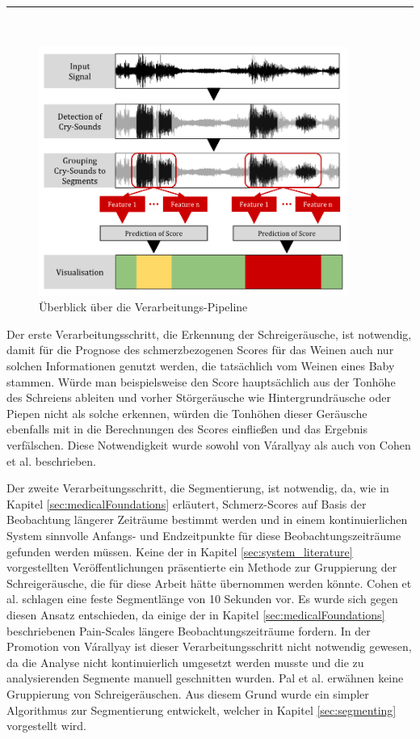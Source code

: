 \noindent\rule{\linewidth}{0.3pt} \\

\begin{figure}[h]
	\centering
	\includegraphics[width=0.9\textwidth]{bilder/konzept03.png}
	\caption{Überblick über die Verarbeitungs-Pipeline}
	\label{img:architecture-overview}
\end{figure}

Der erste Verarbeitungsschritt, die Erkennung der Schreigeräusche, ist notwendig, damit für die Prognose des schmerzbezogenen Scores für das Weinen auch nur solchen Informationen genutzt werden, die tatsächlich vom Weinen eines Baby stammen. Würde man beispielsweise den Score hauptsächlich aus der Tonhöhe des Schreiens ableiten und vorher Störgeräusche wie Hintergrundräusche oder Piepen nicht als solche erkennen, würden die Tonhöhen dieser Geräusche ebenfalls mit in die Berechnungen des Scores einfließen und das Ergebnis verfälschen. Diese Notwendigkeit wurde sowohl von Várallyay \cite{cry_thesis} als auch von Cohen et al. \cite{cohenCry} beschrieben. 

Der zweite Verarbeitungsschritt, die Segmentierung, ist notwendig, da, wie in Kapitel \ref{sec:medicalFoundations} erläutert, Schmerz-Scores auf Basis der Beobachtung längerer Zeiträume bestimmt werden und in einem kontinuierlichen System sinnvolle Anfangs- und Endzeitpunkte für diese Beobachtungszeiträume gefunden werden müssen. Keine der in Kapitel \ref{sec:system_literature} vorgestellten Veröffentlichungen präsentierte ein Methode zur Gruppierung der Schreigeräusche, die für diese Arbeit hätte übernommen werden könnte. Cohen et al. \cite{cohenCry} schlagen eine feste Segmentlänge von 10 Sekunden vor. Es wurde sich gegen diesen Ansatz entschieden, da einige der in Kapitel \ref{sec:medicalFoundations} beschriebenen Pain-Scales längere Beobachtungszeiträume fordern. In der Promotion von Várallyay \cite{cry_thesis} ist dieser Verarbeitungsschritt nicht notwendig gewesen, da die Analyse nicht kontinuierlich umgesetzt werden musste und die zu analysierenden Segmente manuell geschnitten wurden. Pal et al. \cite{palEmotion} erwähnen keine Gruppierung von Schreigeräuschen. Aus diesem Grund wurde ein simpler Algorithmus zur Segmentierung entwickelt, welcher in Kapitel \ref{sec:segmenting} vorgestellt wird.

